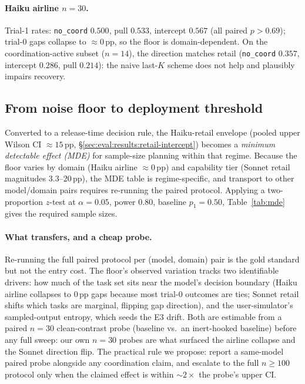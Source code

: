 \paragraph{Haiku airline $n{=}30$.}
Trial-1 rates: \texttt{no\_coord} $0.500$, pull $0.533$,
intercept $0.567$ (all paired $p{>}0.69$); trial-0 gaps collapse
to $\approx 0$\,pp, so the floor is domain-dependent. On the
coordination-active subset ($n{=}14$), the direction matches
retail (\texttt{no\_coord} $0.357$, intercept $0.286$, pull
$0.214$): the naive last-$K$ scheme does not help and plausibly
impairs recovery.

\subsection{From noise floor to deployment threshold}
\label{sec:eval:deployment}

Converted to a release-time decision rule, the Haiku-retail
envelope (pooled upper Wilson CI ${\approx}15$\,pp,
\S\ref{sec:eval:results:retail-intercept}) becomes a
\emph{minimum detectable effect (MDE)} for sample-size planning
within that regime. Because the floor varies by domain (Haiku
airline $\approx 0$\,pp) and capability tier (Sonnet retail
magnitudes $3.3$--$20$\,pp), the MDE table is regime-specific, and transport
to other model/domain pairs requires re-running the paired
protocol. Applying a two-proportion $z$-test at $\alpha{=}0.05$,
power $0.80$, baseline $p_1{=}0.50$, Table~\ref{tab:mde} gives
the required sample sizes.

\paragraph{What transfers, and a cheap probe.}
Re-running the full paired protocol per (model, domain) pair is
the gold standard but not the entry cost. The floor's observed
variation tracks two identifiable drivers: how much of the task
set sits near the model's decision boundary (Haiku airline
collapses to $0$\,pp gaps because most trial-$0$ outcomes are
ties; Sonnet retail shifts which tasks are marginal, flipping
gap direction), and the user-simulator's sampled-output entropy,
which seeds the E3 drift. Both are estimable from a paired
$n{=}30$ clean-contrast probe (baseline vs.\ an inert-hooked
baseline) before any full sweep: our own $n{=}30$ probes are
what surfaced the airline collapse and the Sonnet direction
flip. The practical rule we propose: report a same-model paired
probe alongside any coordination claim, and escalate to the
full $n{\geq}100$ protocol only when the claimed effect is
within ${\sim}2\times$ the probe's upper CI.

